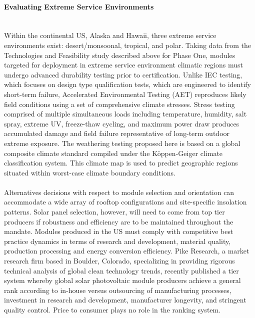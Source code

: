 \paragraph{Evaluating Extreme Service Environments} \mbox{ }\\
Within the continental US, Alaska and Hawaii, three extreme service environments exist: desert/monsoonal, tropical, and polar. Taking data from the Technologies and Feasibility study described above for Phase One, modules targeted for deployment in extreme service environment climatic regions must undergo advanced durability testing prior to certification. Unlike IEC testing, which focuses on design type qualification tests, which are engineered to identify short-term failure, Accelerated Environmental Testing (AET) reproduces likely field conditions using a set of comprehensive climate stresses. Stress testing comprised of multiple simultaneous loads including temperature, humidity, salt spray, extreme UV, freeze-thaw cycling, and maximum power draw produces accumulated damage and field failure representative of long-term outdoor extreme exposure. The weathering testing proposed here is based on a global composite climate standard compiled under the Köppen-Geiger climate classification system. This climate map is used to predict geographic regions situated within worst-case climate boundary conditions.
\\\\
\noindent Alternatives decisions with respect to module selection and orientation can accommodate a wide array of rooftop configurations and site-specific insolation patterns. Solar panel selection, however, will need to come from top tier producers if robustness and efficiency are to be maintained throughout the mandate. Modules produced in the US must comply with competitive best practice dynamics in terms of research and development, material quality, production processing and energy conversion efficiency. Pike Research, a market research firm based in Boulder, Colorado, specializing in providing rigorous technical analysis of global clean technology trends, recently published a tier system whereby global solar photovoltaic module producers achieve a general rank according to in-house versus outsourcing of manufacturing processes, investment in research and development, manufacturer longevity, and stringent quality control. Price to consumer plays no role in the ranking system.

